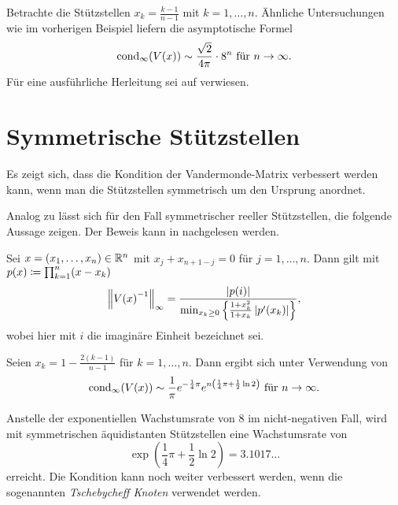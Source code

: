 \begin{example}
    Betrachte die Stützstellen $x_k = \frac{k-1}{n-1}$ mit ${k=1, \dots, n}$.
    Ähnliche Untersuchungen wie im vorherigen Beispiel liefern die
    asymptotische Formel
    \[
        \cond[\infty]{\Vand{x}} \sim \frac{\sqrt{2}}{4\pi} \cdot 8^n \text{ für } n \rightarrow \infty.
    \]
    Für eine ausführliche Herleitung sei auf \cite[S. 344f]{gautschi3}
    verwiesen.
\end{example}

\section{Symmetrische Stützstellen}
Es zeigt sich, dass die Kondition der Vandermonde-Matrix verbessert werden
kann, wenn man die Stützstellen symmetrisch um den Ursprung anordnet.

Analog zu  lässt sich für den Fall
symmetrischer reeller Stützstellen, die folgende Aussage zeigen.
Der Beweis kann in \cite[S. 341]{gautschi3} nachgelesen werden.
\begin{lemma}
    \label{lemma:symmetric_real_nodes}
    Sei $x = (x_1, \dots, x_n) \in \Rn$ mit $x_j + x_{n+1-j} = 0$ für $j = 1, \dots, n$.
    Dann gilt mit $p(x) \defeq \prod_{k=1}^{n} (x - x_k)$
    \[
        \norm{\Vand{x}^{-1}}_\infty = \frac{\abs{p(i)}}{\min_{x_k \geq 0} \left\{ \frac{1 + x_k^2}{1 + x_k} \abs{p^{\prime}(x_k)} \right\} },
    \]
    wobei hier mit $i$ die imaginäre Einheit bezeichnet sei.
\end{lemma}

\begin{example}
    Seien $x_k = 1 - \frac{2(k-1)}{n-1}$ für ${k = 1, \dots, n}$.
    Dann ergibt sich unter Verwendung von 
    \[
        \cond[\infty]{\Vand{x}} \sim \frac{1}{\pi} e^{-\frac{1}{4} \pi} e^{n\left( \frac{1}{4} \pi + \frac{1}{2} \ln 2 \right)} \text{ für } n \rightarrow \infty.
    \]
\end{example}

Anstelle der exponentiellen Wachstumsrate von $8$ im nicht-negativen Fall, wird mit
symmetrischen äquidistanten Stützstellen eine Wachstumsrate von
\[
    \exp \left( \frac{1}{4} \pi + \frac{1}{2} \ln 2 \right) = 3.1017\dots
\]
erreicht.
Die Kondition kann noch weiter verbessert werden, wenn die sogenannten
\emph{Tschebycheff Knoten} verwendet werden.

